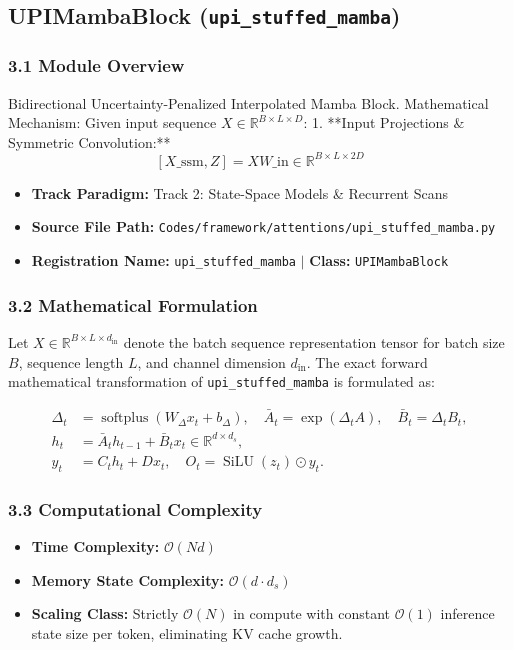 \subsection{UPIMambaBlock (\texttt{upi\_stuffed\_mamba})}
\label{sec:app_module_upi\_stuffed\_mamba}

\subsubsection*{3.1 Module Overview}
Bidirectional Uncertainty-Penalized Interpolated Mamba Block.  Mathematical Mechanism:     Given input sequence $X \in \mathbb{R}^{B \times L \times D}$:     1. **Input Projections \& Symmetric Convolution:**        $$[X\_{\text{ssm}}, Z] = X W\_{\text{in}} \in \mathbb{R}^{B \times L \times 2 D}$$
\begin{itemize}
    \item \textbf{Track Paradigm:} Track 2: State-Space Models & Recurrent Scans
    \item \textbf{Source File Path:} \texttt{Codes/framework/attentions/upi\_stuffed\_mamba.py}
    \item \textbf{Registration Name:} \texttt{upi\_stuffed\_mamba} $\mid$ \textbf{Class:} \texttt{UPIMambaBlock}
\end{itemize}

\subsubsection*{3.2 Mathematical Formulation}
Let $X \in \mathbb{R}^{B \times L \times d_{\text{in}}}$ denote the batch sequence representation tensor for batch size $B$, sequence length $L$, and channel dimension $d_{\text{in}}$. The exact forward mathematical transformation of \texttt{upi\_stuffed\_mamba} is formulated as:

\begin{align}
\Delta_t &= \operatorname{softplus}(W_\Delta x_t + b_\Delta), \quad \bar{A}_t = \exp(\Delta_t A), \quad \bar{B}_t = \Delta_t B_t, \\
h_t &= \bar{A}_t h_{t-1} + \bar{B}_t x_t \in \mathbb{R}^{d \times d_s}, \\
y_t &= C_t h_t + D x_t, \quad O_t = \operatorname{SiLU}(z_t) \odot y_t.
\end{align}


\subsubsection*{3.3 Computational Complexity}
\begin{itemize}
    \item \textbf{Time Complexity:} $\mathcal{O}(N d)$
    \item \textbf{Memory State Complexity:} $\mathcal{O}(d \cdot d_s)$
    \item \textbf{Scaling Class:} Strictly $\mathcal{O}(N)$ in compute with constant $\mathcal{O}(1)$ inference state size per token, eliminating KV cache growth.
\end{itemize}

